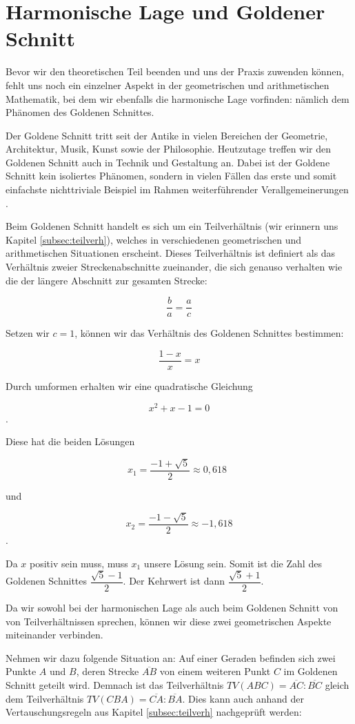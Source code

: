 \documentclass[12pt,a4paper]{article}
\begin{document}
\newpage
\section{Harmonische Lage und Goldener Schnitt}

Bevor wir den theoretischen Teil beenden und uns der Praxis zuwenden können, fehlt uns noch ein einzelner Aspekt in der geometrischen und arithmetischen Mathematik, bei dem wir ebenfalls die harmonische Lage vorfinden: nämlich dem Phänomen des Goldenen Schnittes.

Der Goldene Schnitt tritt seit der Antike in  vielen Bereichen der Geometrie, Architektur, Musik, Kunst sowie der Philosophie. Heutzutage treffen wir den Goldenen Schnitt auch in Technik und Gestaltung an. Dabei ist der Goldene Schnitt kein isoliertes Phänomen, sondern in vielen Fällen das erste und somit einfachste nichttriviale Beispiel im Rahmen weiterführender Verallgemeinerungen \citep[s.][S.~5]{goldenerSchnitt}.

Beim Goldenen Schnitt handelt es sich um ein Teilverhältnis (wir erinnern uns Kapitel \ref{subsec:teilverh}), welches in verschiedenen geometrischen und arithmetischen Situationen erscheint. Dieses Teilverhältnis ist definiert als das Verhältnis zweier Streckenabschnitte zueinander, die sich genauso verhalten wie die der längere Abschnitt zur gesamten Strecke:

\[\dfrac{b}{a} = \dfrac{a}{c}\]

Setzen wir $c = 1$, können wir das Verhältnis des Goldenen Schnittes bestimmen:

\[\dfrac{1-x}{x} = x\]

Durch umformen erhalten wir eine quadratische Gleichung

\[x^2 + x - 1 = 0\].

Diese hat die beiden Lösungen

\[x_1 = \dfrac{-1 + \sqrt{5}}{2} \approx 0,618~~ \]

und

\[ x_2 = \dfrac{-1 - \sqrt{5}}{2} \approx -1,618 \].

Da $x$ positiv sein muss, muss $x_1$ unsere Lösung sein. Somit ist die Zahl des Goldenen Schnittes $\dfrac{\sqrt{5}-1}{2}$. Der Kehrwert ist dann $\dfrac{\sqrt{5}+1}{2}$.

Da wir sowohl bei der harmonischen Lage als auch beim Goldenen Schnitt von von Teilverhältnissen sprechen, können wir diese zwei geometrischen Aspekte miteinander verbinden.

Nehmen wir dazu folgende Situation an: Auf einer Geraden befinden sich zwei Punkte $A$ und $B$, deren Strecke $\overline{A B}$ von einem weiteren Punkt $C$ im Goldenen Schnitt geteilt wird. Demnach ist das Teilverhältnis $TV(A B C) = \overline{A C} : \overline{B C}$ gleich dem Teilverhältnis $TV(C B A) = \overline{C A} : \overline{B A}$. Dies kann auch anhand der Vertauschungsregeln aus Kapitel \ref{subsec:teilverh} nachgeprüft werden:
\end{document}

